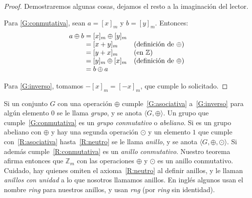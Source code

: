   \begin{proof}
    Demostraremos algunas cosas,
    dejamos el resto a la imaginación del lector.

    Para \ref{G:conmutativa},
    sean \(a = [x]_m\) y \(b = [y]_m\).
    Entonces:
    \begin{equation*}
      \begin{array}{l@{{}={}}ll}
	a \oplus b
	  & [x]_m \oplus [y]_m & \\
	  & [x + y]_m	       & \text{(definición de \(\oplus\))} \\
	  & [y + x]_m	       & \text{(en \(\mathbb{Z}\))} \\
	  & [y]_m \oplus [x]_m & \text{(definición de \(\oplus\))} \\
	  & b \oplus a
      \end{array}
    \end{equation*}

    Para \ref{G:inverso},
    tomamos \(-[x]_m = [-x]_m\),
    que cumple lo solicitado.
  \end{proof}
  Si un conjunto \(G\) con una operación \(\oplus\) cumple~\ref{G:asociativa}
  a~\ref{G:inverso}
  para algún elemento \(0\)
  se le llama \emph{grupo},%
  y se anota \(\langle G, \oplus \rangle\).
  Un grupo que cumple~\ref{G:conmutativa}
  es un \emph{grupo conmutativo} o \emph{abeliano}.%
  Si es un grupo abeliano con \(\oplus\)
  y hay una segunda operación \(\odot\) y un elemento \(1\)
  que cumple con~\ref{R:asociativa} hasta~\ref{R:neutro}
  se le llama \emph{anillo},%
  y se anota \(\langle G, \oplus, \odot \rangle\).
  Si además cumple~\ref{R:conmutativa}
  es un \emph{anillo conmutativo}.%
  Nuestro teorema afirma entonces que \(\mathbb{Z}_m\)
  con las operaciones \(\oplus\) y \(\odot\) es un anillo conmutativo.
  Cuidado,
  hay quienes omiten el axioma~\ref{R:neutro} al definir anillos,
  y le llaman \emph{anillos con unidad} a lo que nosotros llamamos anillos.%
  En inglés algunos usan el nombre \emph{\foreignlanguage{english}{ring}}%
  para nuestros anillos,
  y usan \emph{\foreignlanguage{english}{rng}}
  (por \emph{\foreignlanguage{english}{ring}} sin identidad).
